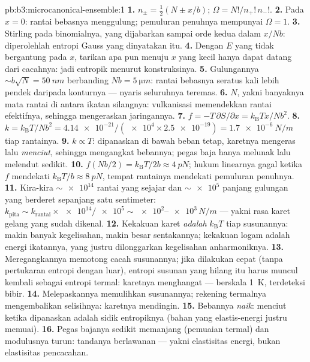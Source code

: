 \begin{solution}{pb:b3:microcanonical-ensemble:1}
\textbf{1.} $n_\pm = \tfrac12(N \pm x/b)$; $\Omega =
N!/n_+!\,n_-!$.
\textbf{2.} Pada $x = 0$: rantai bebasnya menggulung; pemuluran penuhnya
mempunyai $\Omega = 1$.
\textbf{3.} Stirling pada binomialnya, yang dijabarkan sampai orde kedua
dalam $x/Nb$: diperolehlah entropi Gauss yang dinyatakan itu.
\textbf{4.} Dengan $E$ yang tidak bergantung pada $x$, tarikan apa pun
menuju $x$ yang kecil hanya dapat datang dari cacahnya: jadi entropik
menurut konstruksinya.
\textbf{5.} Gulungannya $\sim b\sqrt N = \qty{50}{nm}$ berbanding $Nb =
\qty{5}{\micro m}$: rantai bebasnya seratus kali lebih pendek daripada
konturnya --- nyaris seluruhnya teremas.
\textbf{6.} $N$, yakni banyaknya mata rantai di antara ikatan silangnya:
vulkanisasi memendekkan rantai efektifnya, sehingga mengeraskan
jaringannya.
\textbf{7.} $f = -T\,\partial S/\partial x =
k_{\text{B}}Tx/Nb^2$.
\textbf{8.} $k = k_{\text{B}}T/Nb^2 = \num{4.14e-21}/(\num{e4}
\times \num{2.5e-19}) = \qty{1.7e-6}{N/m}$ tiap rantainya.
\textbf{9.} $k \propto T$: dipanaskan di bawah beban tetap, karetnya
mengeras lalu \emph{menciut}, sehingga mengangkat bebannya; pegas baja
hanya melunak lalu melendut sedikit.
\textbf{10.} $f(Nb/2) = k_{\text{B}}T/2b \approx \qty{4}{pN}$;
hukum linearnya gagal ketika $f$ mendekati $k_{\text{B}}T/b \approx
\qty{8}{pN}$, tempat rantainya mendekati pemuluran penuhnya.
\textbf{11.} Kira-kira $\sim\num{e14}$ rantai yang sejajar dan
$\sim\num{e5}$ panjang gulungan yang berderet sepanjang satu sentimeter:
$k_{\text{pita}} \sim k_{\text{rantai}} \times \num{e14}/\num{e5}
\sim \num{e2}$--$\num{e3}\,\unit{N/m}$ --- yakni rasa karet gelang yang
sudah dikenal.
\textbf{12.} Kekakuan karet \emph{adalah} $k_{\text{B}}T$ tiap
susunannya: makin banyak kegelisahan, makin besar sentakannya; kekakuan
logam adalah energi ikatannya, yang justru dilonggarkan kegelisahan
anharmoniknya.
\textbf{13.} Meregangkannya memotong cacah susunannya; jika dilakukan
cepat (tanpa pertukaran entropi dengan luar), entropi susunan yang hilang
itu harus muncul kembali sebagai entropi termal: karetnya menghangat ---
berskala \qty{1}{K}, terdeteksi bibir.
\textbf{14.} Melepaskannya memulihkan susunannya; rekening termalnya
mengembalikan selisihnya: karetnya mendingin.
\textbf{15.} Bebannya \emph{naik}: menciut ketika dipanaskan adalah sidik
entropiknya (bahan yang elastis-energi justru memuai).
\textbf{16.} Pegas bajanya sedikit memanjang (pemuaian termal) dan
modulusnya turun: tandanya berlawanan --- yakni elastisitas energi, bukan
elastisitas pencacahan.

\end{solution}

